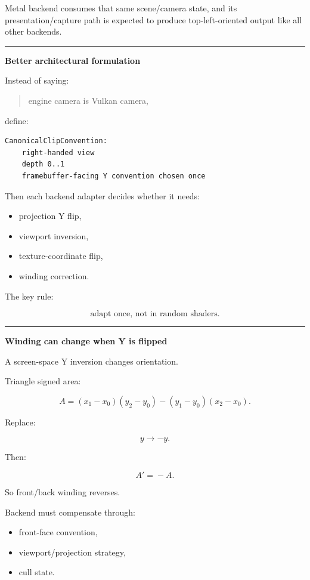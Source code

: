 Metal backend consumes that same scene/camera state, and its presentation/capture path is expected to produce top-left-oriented output like all other backends.

\begin{center}\rule{0.5\linewidth}{0.5pt}\end{center}

\textbf{Better architectural formulation}

Instead of saying:

\begin{quote}
engine camera is Vulkan camera,
\end{quote}

define:

\begin{verbatim}
CanonicalClipConvention:
    right-handed view
    depth 0..1
    framebuffer-facing Y convention chosen once
\end{verbatim}

Then each backend adapter decides whether it needs:

\begin{itemize}
\tightlist
\item
  projection Y flip,
\item
  viewport inversion,
\item
  texture-coordinate flip,
\item
  winding correction.
\end{itemize}

The key rule:

\[
\boxed{
\text{adapt once, not in random shaders}.
}
\]

\begin{center}\rule{0.5\linewidth}{0.5pt}\end{center}

\textbf{Winding can change when Y is flipped}

A screen-space Y inversion changes orientation.

Triangle signed area:

\[
A=
(x_1-x_0)(y_2-y_0)
-
(y_1-y_0)(x_2-x_0).
\]

Replace:

\[
y\rightarrow-y.
\]

Then:

\[
A'\!=\!-A.
\]

So front/back winding reverses.

Backend must compensate through:

\begin{itemize}
\tightlist
\item
  front-face convention,
\item
  viewport/projection strategy,
\item
  cull state.
\end{itemize}

